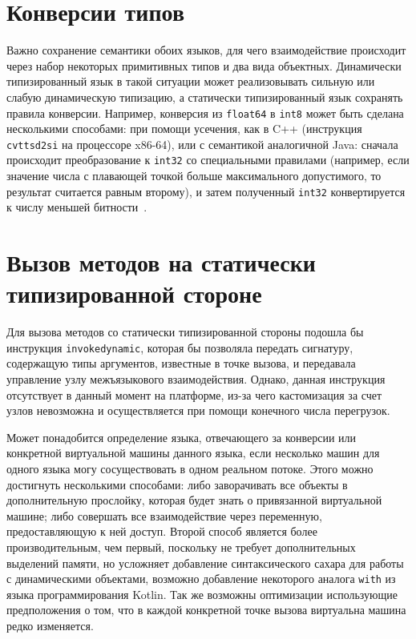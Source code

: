 \documentclass[times
]{itmo-student-thesis}
\def\Indy{\texttt{invokedynamic}}
\begin{document}
\section{Конверсии типов}
Важно сохранение семантики обоих языков, для чего взаимодействие происходит через набор некоторых примитивных типов и два вида объектных. Динамически типизированный язык в такой ситуации может реализовывать сильную или слабую динамическую типизацию, а статически типизированный язык сохранять правила конверсии. Например, конверсия из \texttt{float64} в \texttt{int8} может быть сделана несколькими способами: при помощи усечения, как в C++ (инструкция \texttt{cvttsd2si} на процессоре x86-64), или с семантикой аналогичной Java: сначала происходит преобразование к \texttt{int32} со специальными правилами (например, если значение числа с плавающей точкой больше максимального допустимого, то результат считается равным второму), и затем полученный \texttt{int32} конвертируется к числу меньшей битности~\cite{java8-spec}.

\section{Вызов методов на статически типизированной стороне}
Для вызова методов со статически типизированной стороны подошла бы инструкция \Indy, которая бы позволяла передать сигнатуру, содержащую типы аргументов, известные в точке вызова, и передавала управление узлу межъязыкового взаимодействия. Однако, данная инструкция отсутствует в данный момент на платформе, из-за чего кастомизация за счет узлов невозможна и осуществляется при помощи конечного числа перегрузок.

Может понадобится определение языка, отвечающего за конверсии или конкретной виртуальной машины данного языка, если несколько машин для одного языка могу сосуществовать в одном реальном потоке. Этого можно достигнуть несколькими способами: либо заворачивать все объекты в дополнительную прослойку, которая будет знать о привязанной виртуальной машине; либо совершать все взаимодействие через переменную, предоставляющую к ней доступ. Второй способ является более производительным, чем первый, поскольку не требует дополнительных выделений памяти, но усложняет добавление синтаксического сахара для работы с динамическими объектами, возможно добавление некоторого аналога \texttt{with} из языка программирования Kotlin. Так же возможны оптимизации использующие предположения о том, что в каждой конкретной точке вызова виртуальна машина редко изменяется.
\end{document}
